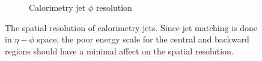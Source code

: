 \begin{figure}
\begin{subfigure}{0.4\textwidth}
        \caption{Calorimetry jet $\phi$ resolution}
        \label{fig:calo_phi_resolution}
    \end{subfigure}
    \caption{The spatial resolution of calorimetry jets.  Since jet matching is done in $\eta-\phi$ space, the poor energy scale for the central and backward regions should have a minimal affect on the spatial resolution.}
    \label{fig:calo_spatial_reso_scale}
\end{figure}
